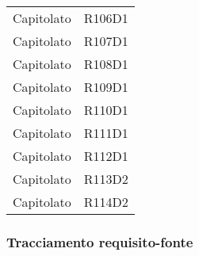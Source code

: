 \documentclass[../analisi-dei-requisiti.tex]{subfiles}
\begin{document}
\begin{center}
\begin{longtable}[H]{ p{3cm} | p{4cm} }
  Capitolato                    & R106D1                               \\
  Capitolato                    & R107D1                               \\
  Capitolato                    & R108D1                               \\
  Capitolato                    & R109D1                               \\
  Capitolato                    & R110D1                               \\
  Capitolato                    & R111D1                               \\
  Capitolato                    & R112D1                               \\
  Capitolato                    & R113D2                               \\
  Capitolato                    & R114D2                               \\
\end{longtable}
\end{center}

\newpage
\subsubsection{Tracciamento requisito-fonte}%
\label{sub:tracciamento_requisito-fonte}
\end{document}
